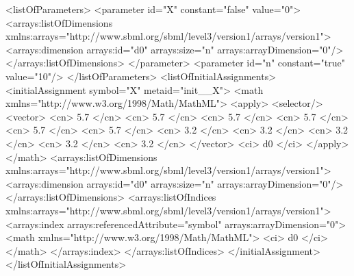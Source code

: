 \begin{example}
    
<listOfParameters>
    <parameter id="X" constant="false" value="0">
        <arrays:listOfDimensions
            xmlns:arrays="http://www.sbml.org/sbml/level3/version1/arrays/version1">
            <arrays:dimension arrays:id="d0" arrays:size="n" arrays:arrayDimension="0"/>
        </arrays:listOfDimensions>
    </parameter>
    <parameter id="n" constant="true" value="10"/>
</listOfParameters>
<listOfInitialAssignments>
    <initialAssignment symbol="X" metaid="init__X">
        <math xmlns="http://www.w3.org/1998/Math/MathML">
            <apply>
              <selector/>
              <vector>
                  <cn> 5.7 </cn>
                  <cn> 5.7 </cn>
                  <cn> 5.7 </cn>
                  <cn> 5.7 </cn>
                  <cn> 5.7 </cn>
                  <cn> 5.7 </cn>
                  <cn> 3.2 </cn>
                  <cn> 3.2 </cn>
                  <cn> 3.2 </cn>
                  <cn> 3.2 </cn>
                  <cn> 3.2 </cn>
              </vector>
              <ci> d0 </ci>
            </apply>
        </math>
        <arrays:listOfDimensions
            xmlns:arrays="http://www.sbml.org/sbml/level3/version1/arrays/version1">
            <arrays:dimension arrays:id="d0" arrays:size="n" arrays:arrayDimension="0"/>
        </arrays:listOfDimensions>
        <arrays:listOfIndices
            xmlns:arrays="http://www.sbml.org/sbml/level3/version1/arrays/version1">
            <arrays:index arrays:referencedAttribute="symbol" arrays:arrayDimension="0">
                <math xmlns="http://www.w3.org/1998/Math/MathML">
                    <ci> d0 </ci>
                </math>
            </arrays:index>
        </arrays:listOfIndices>
    </initialAssignment>
</listOfInitialAssignments>
\end{example}



